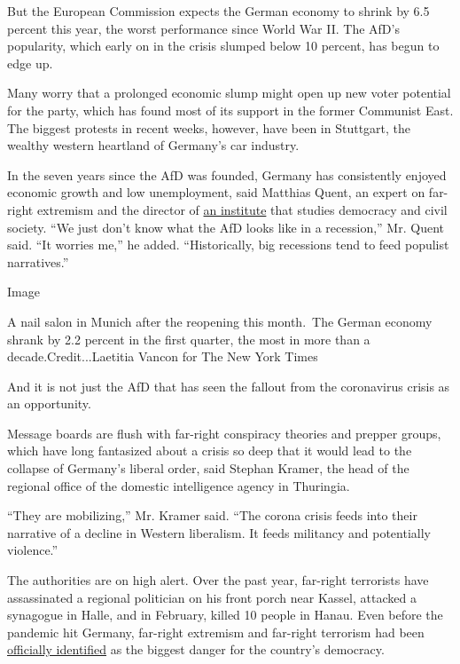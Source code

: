 But the European Commission expects the German economy to shrink by 6.5
percent this year, the worst performance since World War II. The AfD's
popularity, which early on in the crisis slumped below 10 percent, has
begun to edge up.

Many worry that a prolonged economic slump might open up new voter
potential for the party, which has found most of its support in the
former Communist East. The biggest protests in recent weeks, however,
have been in Stuttgart, the wealthy western heartland of Germany's car
industry.

In the seven years since the AfD was founded, Germany has consistently
enjoyed economic growth and low unemployment, said Matthias Quent, an
expert on far-right extremism and the director of
\href{https://www.idz-jena.de/ueber-das-institut/mitarbeitende/}{an
institute} that studies democracy and civil society. ``We just don't
know what the AfD looks like in a recession,'' Mr. Quent said. ``It
worries me,'' he added. ``Historically, big recessions tend to feed
populist narratives.''

Image

A nail salon in Munich after the reopening this month.~The German
economy shrank by 2.2 percent in the first quarter, the most in more
than a decade.Credit...Laetitia Vancon for The New York Times

And it is not just the AfD that has seen the fallout from the
coronavirus crisis as an opportunity.

Message boards are flush with far-right conspiracy theories and prepper
groups, which have long fantasized about a crisis so deep that it would
lead to the collapse of Germany's liberal order, said Stephan Kramer,
the head of the regional office of the domestic intelligence agency in
Thuringia.

``They are mobilizing,'' Mr. Kramer said. ``The corona crisis feeds into
their narrative of a decline in Western liberalism. It feeds militancy
and potentially violence.''

The authorities are on high alert. Over the past year, far-right
terrorists have assassinated a regional politician on his front porch
near Kassel, attacked a synagogue in Halle, and in February, killed 10
people in Hanau. Even before the pandemic hit Germany, far-right
extremism and far-right terrorism had been
\href{https://www.nytimes.com/2020/03/12/world/europe/germany-afd.html}{officially
identified} as the biggest danger for the country's democracy.

